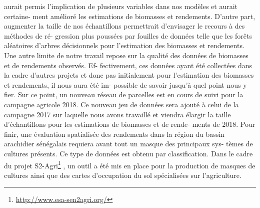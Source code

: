 aurait permis l’implication de plusieurs variables dans nos modèles et aurait certaine-
ment amélioré les estimations de biomasses et rendements. D’autre part, augmenter
la taille de nos échantillons permettrait d’envisager le recours à des méthodes de ré-
gression plus poussées par fouilles de données telle que les forêts aléatoires d’arbres
décisionnels pour l’estimation des biomasses et rendements. Une autre limite de notre
travail repose sur la qualité des données de biomasses et de rendements observés. Ef-
fectivement, ces données ayant été collectées dans la cadre d’autres projets et donc
pas initialement pour l’estimation des biomasses et rendements, il nous aura été im-
possible de savoir jusqu’à quel point nous y fier. Sur ce point, un nouveau réseau de
parcelles est en cours de suivi pour la campagne agricole 2018. Ce nouveau jeu de
données sera ajouté à celui de la campagne 2017 sur laquelle nous avons travaillé et
viendra élargir la taille d’échantillons pour les estimations de biomasses et de rende-
ments de 2018. Pour finir, une évaluation spatialisée des rendements dans la région
du bassin arachidier sénégalais requiera avant tout un masque des principaux sys-
tèmes de cultures présents. Ce type de données est obtenu par classification. Dans le
cadre du projet S2-Agri\footnote{\url{http://www.esa-sen2agri.org/}} , un outil a été mis en place pour la production de masques
de cultures ainsi que des cartes d’occupation du sol spécialisées sur l’agriculture.
